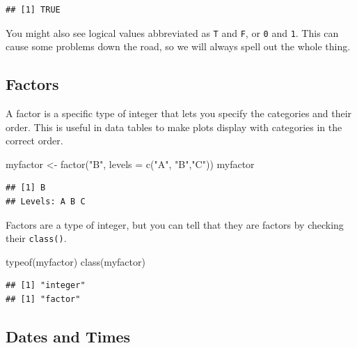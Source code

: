 \documentclass[
  oneside]{book}
\newenvironment{Shaded}{\begin{snugshade}}{\end{snugshade}}
\newcommand{\AttributeTok}[1]{\textcolor[rgb]{0.77,0.63,0.00}{#1}}
\newcommand{\FunctionTok}[1]{\textcolor[rgb]{0.00,0.00,0.00}{#1}}
\newcommand{\NormalTok}[1]{#1}
\newcommand{\OtherTok}[1]{\textcolor[rgb]{0.56,0.35,0.01}{#1}}
\newcommand{\StringTok}[1]{\textcolor[rgb]{0.31,0.60,0.02}{#1}}
\begin{document}
\begin{verbatim}
## [1] TRUE
\end{verbatim}

\begin{info}
You might also see logical values abbreviated as \texttt{T} and \texttt{F}, or \texttt{0} and \texttt{1}. This can cause some problems down the road, so we will always spell out the whole thing.

\end{info}

\hypertarget{factors}{%
\subsection{Factors}\label{factors}}

A factor is a specific type of integer that lets you specify the categories and their order. This is useful in data tables to make plots display with categories in the correct order.

\begin{Shaded}
\begin{Highlighting}[]
\NormalTok{myfactor }\OtherTok{\textless{}{-}} \FunctionTok{factor}\NormalTok{(}\StringTok{"B"}\NormalTok{, }\AttributeTok{levels =} \FunctionTok{c}\NormalTok{(}\StringTok{"A"}\NormalTok{, }\StringTok{"B"}\NormalTok{,}\StringTok{"C"}\NormalTok{))}
\NormalTok{myfactor}
\end{Highlighting}
\end{Shaded}

\begin{verbatim}
## [1] B
## Levels: A B C
\end{verbatim}

Factors are a type of integer, but you can tell that they are factors by checking their \texttt{class()}.

\begin{Shaded}
\begin{Highlighting}[]
\FunctionTok{typeof}\NormalTok{(myfactor)}
\FunctionTok{class}\NormalTok{(myfactor)}
\end{Highlighting}
\end{Shaded}

\begin{verbatim}
## [1] "integer"
## [1] "factor"
\end{verbatim}

\hypertarget{dates-and-times}{%
\subsection{Dates and Times}\label{dates-and-times}}
\end{document}

